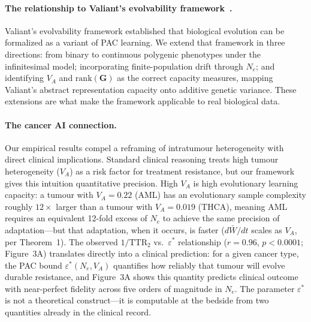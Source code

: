 \documentclass[12pt]{article}
\theoremstyle{remark}
\begin{document}
\paragraph{The relationship to Valiant's evolvability framework~\cite{valiant2009}.} Valiant's evolvability framework established that biological evolution can be formalized as a variant of PAC learning. We extend that framework in three directions: from binary to continuous polygenic phenotypes under the infinitesimal model; incorporating finite-population drift through $N_e$; and identifying $V_A$ and $\mathrm{rank}(\mathbf{G})$ as the correct capacity measures, mapping Valiant's abstract representation capacity onto additive genetic variance. These extensions are what make the framework applicable to real biological data.

\paragraph{The cancer AI connection.} Our empirical results compel a reframing of intratumour heterogeneity with direct clinical implications. Standard clinical reasoning treats high tumour heterogeneity ($V_A$) as a risk factor for treatment resistance, but our framework gives this intuition quantitative precision. High $V_A$ is high evolutionary learning capacity: a tumour with $V_A = 0.22$ (AML) has an evolutionary sample complexity roughly $12\times$ larger than a tumour with $V_A = 0.019$ (THCA), meaning AML requires an equivalent 12-fold excess of $N_e$ to achieve the same precision of adaptation---but that adaptation, when it occurs, is faster ($d\bar{W}/dt$ scales as $V_A$, per Theorem~1). The observed $1/\mathrm{TTR}_2$ vs.\ $\varepsilon^*$ relationship ($r = 0.96$, $p < 0.0001$; Figure~3A) translates directly into a clinical prediction: for a given cancer type, the PAC bound $\varepsilon^*(N_e, V_A)$ quantifies how reliably that tumour will evolve durable resistance, and Figure~3A shows this quantity predicts clinical outcome with near-perfect fidelity across five orders of magnitude in $N_e$. The parameter $\varepsilon^*$ is not a theoretical construct---it is computable at the bedside from two quantities already in the clinical record.
\end{document}
